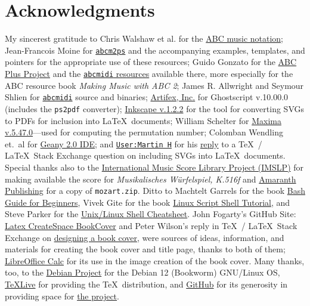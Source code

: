 \documentclass[letterpaper,x11names,svgnames,10pt]{article}
\begin{document}
\section{Acknowledgments}
My sincerest gratitude to Chris Walshaw et al. for the \href{http://www.abcnotation.com/}{ABC music notation}; Jean-Francois Moine for \href{http://moinejf.free.fr/}{\tt abcm2ps} and the accompanying examples, templates, and pointers for the appropriate use of these resources; Guido Gonzato for the \href{http://abcplus.sourceforge.net/}{ABC Plus Project} and the \href{http://abcplus.sourceforge.net/#abcMIDI}{{\tt abcmidi} resources} available there, more especially for the ABC resource book {\em Making Music with ABC 2}; James R. Allwright and Seymour Shlien for \href{http://abc.sourceforge.net/abcMIDI}{\tt abcmidi} source and binaries; \href{https://artifex.com/}{Artifex, Inc.} for Ghostscript v.10.00.0 (includes the {\tt ps2pdf} converter); \href{https://www.inkscape.org/}{Inkscape v.1.2.2} for the tool for converting SVGs to PDFs for inclusion into \LaTeX\ documents; William Schelter for \href{https://maxima.sourceforge.io}{Maxima v.5.47.0}---used for computing the permutation number; Colomban Wendling et.\ al for \href{https://www.geany.org}{Geany 2.0 IDE}; and \href{https://tex.stackexchange.com/users/632/martin-h}{\tt User:Martin H} for his \href{https://tex.stackexchange.com/questions/2099/how-to-include-svg-diagrams-in-latex}{reply} to a \TeX\ / \LaTeX\ Stack Exchange question on including SVGs into \LaTeX\ documents. Special thanks also to the \href{http://imslp.org/}{International Music Score Library Project (IMSLP)} for making available the score for {\em Musikalisches W\"{u}rfelspiel, K.516f} and \href{http://www.amaranthpublishing.com/MozartDiceGame.htm}{Amaranth Publishing} for a copy of {\tt mozart.zip}. Ditto to Machtelt Garrels for the book \href{http://tldp.org/LDP/Bash-Beginners-Guide/html/Bash-Beginners-Guide.html}{Bash Guide for Beginners}, Vivek Gite for the book \href{http://www.freeos.com/guides/lsst/}{Linux Script Shell Tutorial}, and Steve Parker for the \href{http://steve-parker.org/sh/cheatsheet.pdf}{Unix/Linux Shell Cheatsheet}. John Fogarty's GitHub Site: \href{https://github.com/jfogarty/latex-createspace-bookcover}{Latex CreateSpace BookCover} and Peter Wilson's reply in \TeX\ / \LaTeX\ Stack Exchange on \href{https://tex.stackexchange.com/questions/17579/how-can-i-design-a-book-cover}{designing a book cover}, were sources of ideas, information, and materials for creating the book cover and title page, thanks to both of them; \href{http://www.libreoffice.org/}{LibreOffice Calc} for its use in the image creation of the book cover.  Many thanks, too, to the \href{https://www.debian.org}{Debian Project} for the Debian 12 (Bookworm) GNU/Linux OS, \href{http://www.tug.org/texlive/}{TeXLive} for providing the \TeX\ distribution,  and \href{https://github.com}{GitHub} for its generosity in providing space for \href{https://github.com/justineuro/mdgBookSVGKit}{the project}.  
\end{document}
